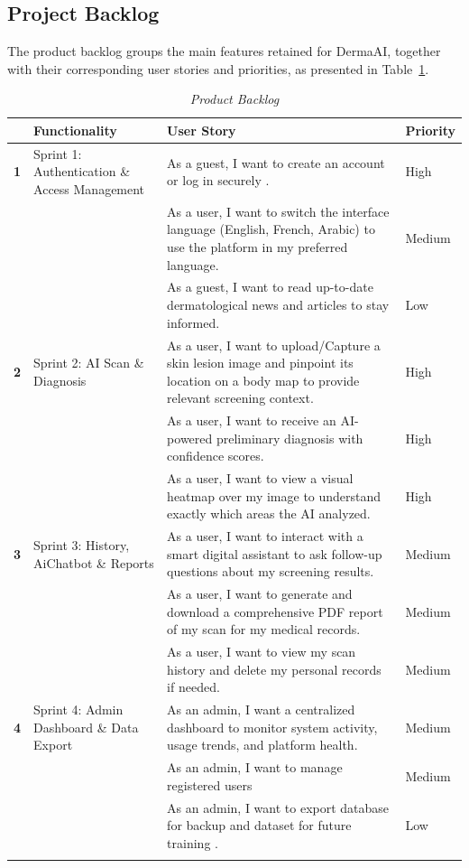 	\subsection{Project Backlog}
	
	The product backlog groups the main features retained for DermaAI, together with
	their corresponding user stories and priorities, as presented in Table~\ref{tab:backlog}.
	{\setlength{\tabcolsep}{4pt}%
	\renewcommand{\arraystretch}{1.35}%
	\small
	\begin{longtable}{|>{\centering\arraybackslash}p{0.6cm}|>{\raggedright\arraybackslash}p{3.9cm}|>{\raggedright\arraybackslash}p{6.9cm}|>{\centering\arraybackslash}p{1.7cm}|}
	\hline
	\rowcolor[HTML]{1F3864}
	{\color{white}\textbf{}} &
	{\color{white}\textbf{Functionality}} &
	{\color{white}\textbf{User Story}} &
	{\color{white}\textbf{Priority}} \\
	\hline
	\endfirsthead
	\hline
	\endhead
	\hline
	\endfoot
	\hline
	\endlastfoot
	\textbf{1} & Sprint 1: Authentication \& Access Management &
	  As a guest, I want to create an account or log in securely . & High \\
	\cline{3-4}
	 & & As a user, I want to switch the interface language (English, French, Arabic) to use the platform in my preferred language. & Medium \\
	\cline{3-4}
	 & & As a guest, I want to read up-to-date dermatological news and articles to stay informed. & Low \\
	\hline
	\textbf{2} & Sprint 2: AI Scan \& Diagnosis &
	  As a user, I want to upload/Capture a skin lesion image and pinpoint its location on a body map to provide relevant screening context. & High \\
	\cline{3-4}
	 & & As a user, I want to receive an AI-powered preliminary diagnosis with confidence scores. & High \\
	\cline{3-4}
	 & & As a user, I want to view a visual heatmap over my image to understand exactly which areas the AI analyzed. & High \\
	\hline
	\textbf{3} & Sprint 3: History, AiChatbot \& Reports &
	  As a user, I want to interact with a smart digital assistant to ask follow-up questions about my screening results. & Medium \\
	\cline{3-4}
	 & & As a user, I want to generate and download a comprehensive PDF report of my scan for my medical records. & Medium \\
	\cline{3-4}
	 & & As a user, I want to view my scan history and delete my personal records if needed. & Medium \\
	\hline
	\textbf{4} & Sprint 4: Admin Dashboard \& Data Export &
	  As an admin, I want a centralized dashboard to monitor system activity, usage trends, and platform health. & Medium \\
	\cline{3-4}
	 & & As an admin, I want to manage registered users & Medium  \\
	\cline{3-4}
	 & & As an admin, I want to export database for backup  and dataset for future training . & Low \\
	\hline
		\caption{\textit{Product Backlog}}\label{tab:backlog}
	\end{longtable}
	}
	
